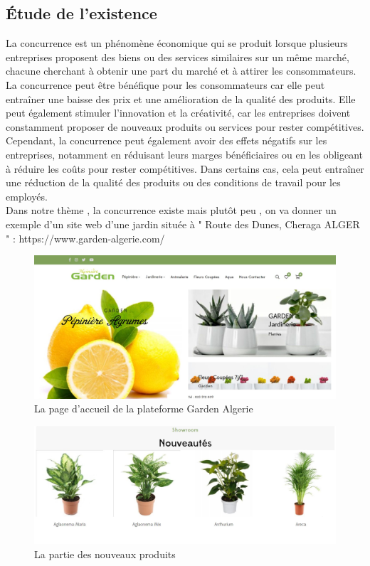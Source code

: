 \documentclass[a4paper,12pt,oneside]{article}
\begin{document}
\subsection{Étude de l'existence}
\hspace{1cm}La concurrence est un phénomène économique qui
se produit lorsque plusieurs entreprises proposent
des biens ou des services similaires sur un même
marché, chacune cherchant à obtenir une part du
marché et à attirer les consommateurs. La
concurrence peut être bénéfique pour les
consommateurs car elle peut entraîner une baisse
des prix et une amélioration de la qualité des
produits. Elle peut également stimuler l'innovation
et la créativité, car les entreprises doivent
constamment proposer de nouveaux produits ou
services pour rester compétitives.
Cependant, la concurrence peut également avoir
des effets négatifs sur les entreprises, notamment
en réduisant leurs marges bénéficiaires ou en les
obligeant à réduire les coûts pour rester
compétitives. Dans certains cas, cela peut
entraîner une réduction de la qualité des produits
ou des conditions de travail pour les employés.\\
\hspace{1cm}Dans notre thème , la concurrence existe mais
plutôt peu , on va donner un exemple d'un
site web d'une jardin située à " Route des Dunes,
Cheraga ALGER " : https://www.garden-algerie.com/ \\

\newpage
		\begin{center}
		\begin{figure}[h]
  		\includegraphics[width=1\textwidth]{Capture1}
  		\caption{La page d'accueil de la plateforme Garden Algerie}
		\end{figure}
		\vskip1cm
		\begin{figure}[h]
  		\includegraphics[width=1\textwidth]{Capture2}
  		\caption{La partie des nouveaux produits}
		\end{figure}
		
		\end{center}
\end{document}
